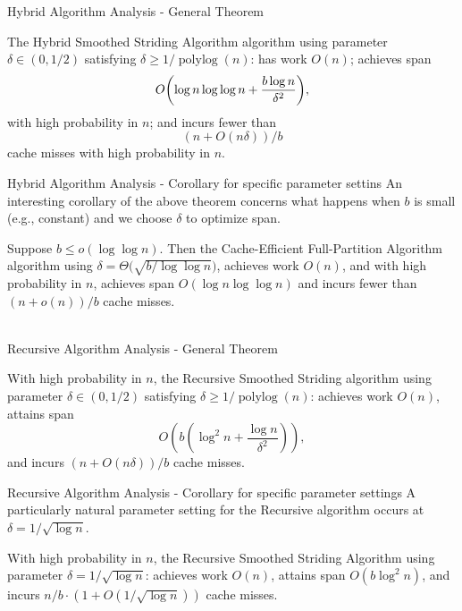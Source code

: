 \documentclass{beamer}
\DeclarePairedDelimiter{\paren}{(}{)}
\newcommand{\polylog}{\operatorname{polylog}}
\begin{document}
\begin{frame}[t]{Hybrid Algorithm Analysis - General Theorem}
\begin{theorem}
	\label{thm:fullPartition}
	The Hybrid Smoothed Striding Algorithm algorithm using parameter $\delta\in(0,1/2)$ satisfying $\delta \ge 1/\polylog(n)$: has work $O(n)$; achieves span
        $$O\paren*{\log n \log\log n +\frac{b\log n}{\delta^2}},$$
with high probability in $n$; and incurs fewer than 
$$(n+O(n\delta))/b$$
cache misses with high probability in $n$.
\end{theorem}
\end{frame}

\begin{frame}[t]{Hybrid Algorithm Analysis - Corollary for specific parameter settins}
An interesting corollary of the above theorem concerns what happens when $b$ is small (e.g., constant) and we choose $\delta$ to optimize span. 
\begin{corollary}
	\label{cor:fullPartition}
Suppose $b \le o(\log \log n)$. Then the Cache-Efficient Full-Partition Algorithm algorithm using $\delta = \Theta\big(\sqrt{b/\log\log n}\big)$, achieves work $O(n)$, and with high probability in $n$, achieves span $O(\log n \log\log n)$ and incurs fewer than $(n+o(n))/b$ cache misses.\\\\
\end{corollary}
\end{frame}


\begin{frame}[t]{Recursive Algorithm Analysis - General Theorem}
	\begin{theorem}
	\label{thm:groupedPartitionAlg}
	With high probability in $n$, the Recursive Smoothed Striding
        algorithm using parameter $\delta \in(0,1/2)$ satisfying
        $\delta \ge 1 / \polylog(n)$: achieves work $O(n)$, attains span
	$$O\left(b\left(\log^2 n + \frac{\log n}{\delta^2}\right)\right),$$
	and incurs $(n+O(n \delta))/b$ cache misses. 
\end{theorem}
\end{frame}

\begin{frame}[t]{Recursive Algorithm Analysis - Corollary for specific parameter settings}
A particularly natural parameter setting for the Recursive algorithm occurs at $\delta = 1 / \sqrt{\log n}$.
\begin{corollary}
  \label{cor:groupedPartitionAlg}
	With high probability in $n$, the Recursive Smoothed Striding Algorithm using parameter $\delta=1/\sqrt{\log n}$:
  achieves work $O(n)$, attains span $O(b\log^2 n)$, and incurs $n/b \cdot (1 + O(1 / \sqrt{\log n}))$ cache misses. 
\end{corollary}
\end{frame}
\end{document}
